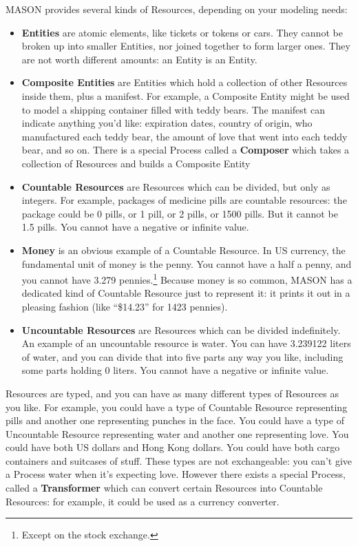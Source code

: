 \documentclass[twoside,10pt]{article}
\begin{document}
MASON provides several kinds of Resources, depending on your modeling needs:

\begin{itemize}
\item {\bf Entities} are atomic elements, like tickets or tokens or cars.  They cannot be broken up into smaller Entities, nor joined together to form larger ones.  They are not worth different amounts: an Entity is an Entity.
\item {\bf Composite Entities} are Entities which hold a collection of other Resources inside them, plus a manifest.  For example, a Composite Entity might be used to model a shipping container filled with teddy bears.  The manifest can indicate anything you'd like: expiration dates, country of origin, who manufactured each teddy bear, the amount of love that went into each teddy bear, and so on.  There is a special Process called a {\bf Composer} which takes a collection of Resources and builds a Composite Entity 
\item {\bf Countable Resources} are Resources which can be divided, but only as integers.  For example, packages of medicine pills are countable resources: the package could be 0 pills, or 1 pill, or 2 pills, or 1500 pills.  But it cannot be 1.5 pills.  You cannot have a negative or infinite value.
\item {\bf Money} is an obvious example of a Countable Resource.  In US currency, the fundamental unit of money is the penny.  You cannot have a half a penny, and you cannot have 3.279 pennies.\footnote{Except on the stock exchange.}  Because money is so common, MASON has a dedicated kind of Countable Resource just to represent it: it prints it out in a pleasing fashion (like ``\$14.23'' for 1423 pennies). 
\item {\bf Uncountable Resources} are Resources which can be divided indefinitely.  An example of an uncountable resource is water.  You can have 3.239122 liters of water, and you can divide that into five parts any way you like, including some parts holding 0 liters.  You cannot have a negative or infinite value.
\end{itemize}

Resources are typed, and you can have as many different types of Resources as you like.  For example, you could have a type of Countable Resource representing pills and another one representing punches in the face.  You could have a type of Uncountable Resource representing water and another one representing love.  You could have both US dollars and Hong Kong dollars.  You could have both cargo containers and suitcases of stuff.  These types are not exchangeable: you can't give a Process water when it's expecting love.  However there exists a special Process, called a {\bf Transformer} which can convert certain Resources into Countable Resources: for example, it could be used as a currency converter.     
\end{document}
